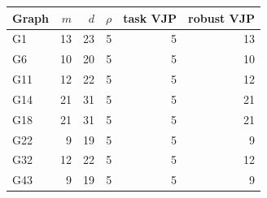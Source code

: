 \begin{tabular}{lrrrrr}\toprule
Graph & $m$ & $d$ & $\rho$ & task VJP & robust VJP \\
\midrule
G1 & 13 & 23 & 5 & 5 & 13 \\
G6 & 10 & 20 & 5 & 5 & 10 \\
G11 & 12 & 22 & 5 & 5 & 12 \\
G14 & 21 & 31 & 5 & 5 & 21 \\
G18 & 21 & 31 & 5 & 5 & 21 \\
G22 & 9 & 19 & 5 & 5 & 9 \\
G32 & 12 & 22 & 5 & 5 & 12 \\
G43 & 9 & 19 & 5 & 5 & 9 \\
\bottomrule\end{tabular}

